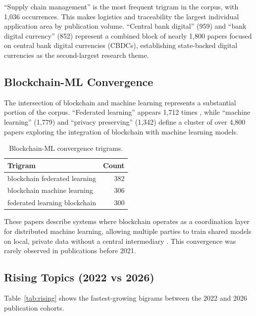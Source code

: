 \documentclass[11pt]{article}
\begin{document}
``Supply chain management'' is the most frequent trigram in the corpus, with 1,036 occurrences. This makes logistics and traceability the largest individual application area by publication volume. ``Central bank digital'' (959) and ``bank digital currency'' (852) represent a combined block of nearly 1,800 papers focused on central bank digital currencies (CBDCs), establishing state-backed digital currencies as the second-largest research theme.

\subsection{Blockchain-ML Convergence}

The intersection of blockchain and machine learning represents a substantial portion of the corpus. ``Federated learning'' appears 1,712 times \citep{yang2019federated, mcmahan2017communication}, while ``machine learning'' (1,779) and ``privacy preserving'' (1,342) \citep{kosba2016hawk} define a cluster of over 4,800 papers exploring the integration of blockchain with machine learning models.

\begin{table}[h]
\centering
\caption{Blockchain-ML convergence trigrams.}
\label{tab:blml}
\begin{tabular}{lr}
\toprule
Trigram & Count \\
\midrule
blockchain federated learning & 382 \\
blockchain machine learning & 306 \\
federated learning blockchain & 300 \\
\bottomrule
\end{tabular}
\end{table}

These papers describe systems where blockchain operates as a coordination layer for distributed machine learning, allowing multiple parties to train shared models on local, private data without a central intermediary \citep{lu2020blockchain}. This convergence was rarely observed in publications before 2021.

\subsection{Rising Topics (2022 vs 2026)}

Table~\ref{tab:rising} shows the fastest-growing bigrams between the 2022 and 2026 publication cohorts.
\end{document}
